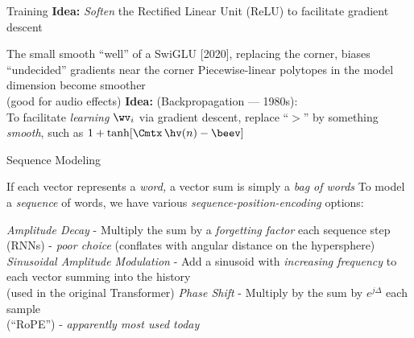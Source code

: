 \begin{slide}[\slideopts,toc={Training}]{Training}
\maybepause
\vspace{1em}
\textbf{Idea:} \emph{Soften} the Rectified Linear Unit (ReLU) to facilitate gradient descent
\begin{itemize}
  \mpitem The small smooth ``well'' of a SwiGLU [2020], replacing the corner, biases ``undecided'' gradients near the corner
  \mpitem Piecewise-linear polytopes in the model dimension become smoother\\
  (good for audio effects)
  \mpitem \textbf{Idea:} (Backpropagation --- 1980s):\\
  To facilitate \emph{learning} $\wv_i$ via gradient descent, replace ``$>$'' by
  something \emph{smooth}, such as $1+\tanh[\Cmtx\,\hv(n) - \beev]$
\end{itemize}
\end{slide}

\begin{slide}[\slideopts,toc={Sequences}]{Sequence Modeling}
  \vspace{-1em}
  \begin{itemize}
    \mpitem If each vector represents a \emph{word,} a vector sum is simply a \emph{bag of words}
    \mpitem To model a \emph{sequence} of words, we have various \emph{sequence-position-encoding} options:
    \begin{enumerate}
      \mpitem \emph{Amplitude Decay} - Multiply the sum by a \emph{forgetting factor} each sequence step\\
      (RNNs) - \emph{poor choice} (conflates with angular distance on the hypersphere)
      \mpitem \emph{Sinusoidal Amplitude Modulation} - Add a sinusoid with \emph{increasing frequency} to each vector summing into the history\\
      (used in the original Transformer)
      \mpitem \emph{Phase Shift} - Multiply by the sum by $e^{j\Delta}$ each sample\\
      (``RoPE'') - \emph{apparently most used today}
    \end{enumerate}
  \end{itemize}
\end{slide}

%

